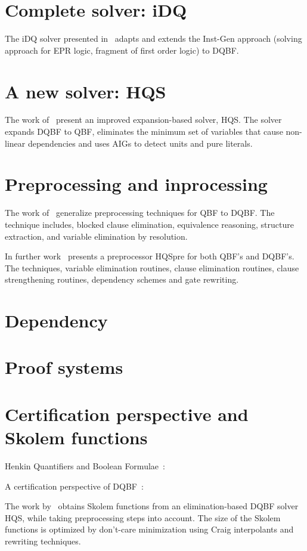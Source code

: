 \documentclass{article}
\begin{document}
\section{Complete solver: iDQ}
The iDQ solver presented in~\cite{frohlich2014idq} adapts and extends the Inst-Gen approach (solving approach for EPR logic, fragment of first order logic) to DQBF.

\section{A new solver: HQS}
The work of~\cite{gitina2015solving} present an improved expansion-based solver, HQS.
%
The solver expands DQBF to QBF, eliminates the minimum set of variables that cause non-linear
dependencies and uses AIGs to detect units and pure literals.

\section{Preprocessing and inprocessing}
The work of~\cite{wimmer2015preprocessing} generalize preprocessing techniques for QBF to DQBF. 
%
The technique includes, blocked clause elimination, equivalence reasoning, structure extraction, and variable elimination by resolution.

In further work~\cite{wimmer2017hqspre} presents a preprocessor HQSpre for both QBF's and DQBF's.
%
The techniques, variable elimination routines, clause elimination routines, clause strengthening routines, dependency schemes and gate rewriting.

\section{Dependency}

\section{Proof systems}

\section{Certification perspective and Skolem functions}

Henkin Quantifiers and Boolean Formulae~\cite{balabanov2012henkin}:

A certification perspective of DQBF~\cite{balabanov2014henkin}:

The work by~\cite{wimmer2016skolem} obtains Skolem functions from an elimination-based DQBF solver HQS, while taking preprocessing steps into account.
%
The size of the Skolem functions is optimized by don’t-care minimization using Craig interpolants and rewriting techniques.



\end{document}
